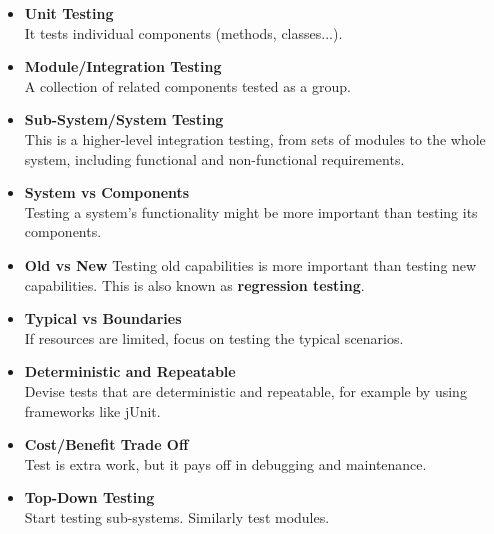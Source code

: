 \documentclass{article}
\begin{document}
\begin{itemize}
	\item \textbf{Unit Testing}
	\vspace{.2cm} \\
	It tests individual components (methods, classes...).
	
	\item \textbf{Module/Integration Testing}
	\vspace{.2cm} \\
	A collection of related components tested as a group.
	
	\item \textbf{Sub-System/System Testing}
	\vspace{.2cm} \\
	This is a higher-level integration testing, from sets of modules to the whole system, including functional and non-functional requirements.
	
	\item \textbf{System vs Components}
	\vspace{.2cm} \\
	Testing a system's functionality might be more important than testing its components.
	
	\item \textbf{Old vs New}
	Testing old capabilities is more important than testing new capabilities. This is also known as \textbf{regression testing}.
	
	\item \textbf{Typical vs Boundaries}
	\vspace{.2cm} \\
	If resources are limited, focus on testing the typical scenarios.
	
	\item \textbf{Deterministic and Repeatable}
	\vspace{.2cm} \\
	Devise tests that are deterministic and repeatable, for example by using frameworks like jUnit.
	
	\item \textbf{Cost/Benefit Trade Off}
	\vspace{.2cm} \\
	Test is extra work, but it pays off in debugging and maintenance.
	
	\item \textbf{Top-Down Testing}
	\vspace{.2cm} \\
	Start testing sub-systems. Similarly test modules.
	

\end{itemize}
\end{document}
